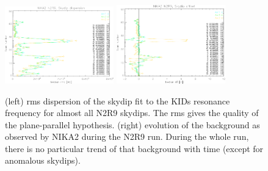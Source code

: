 \begin{figure}[ht!]
  \begin{center} \includegraphics[clip=true, trim={0, -0.3cm, -0.3cm,
    0},
    width=0.42\textwidth]{Figures/Opacity/test_allskd4_N2R9v3_3-crop.pdf} \includegraphics[clip=true,
    trim={0, -0.3cm, -0.3cm, 0},
    width=0.42\textwidth]{Figures/Opacity/test_allskd4_N2R9v3_4-crop.pdf} \caption[]{(left)
    rms dispersion of the skydip fit to the KIDs resonance frequency
    for almost all N2R9 skydips. The rms gives the quality of the
    plane-parallel hypothesis. (right) evolution of the background as
    observed by NIKA2 during the N2R9 run. During the whole run, there
    is no particular trend of that background with time (except for
    anomalous skydips).  }
\label{fig:skydip-stability}
\end{center}
\end{figure}

